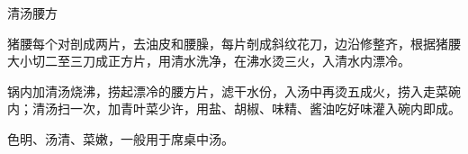 %
%
%
%
%
%
%
\begin{recipe}{清汤腰方}

\ingredients


\preparation

\step 猪腰每个对剖成两片，去油皮和腰臊，每片剞成斜纹花刀，边沿修整齐，根据猪腰
大小切二至三刀成正方片，用清水洗净，在沸水烫三火，入清水内漂冷。

\step 锅内加清汤烧沸，捞起漂冷的腰方片，滤干水份，入汤中再烫五成火，捞入走菜碗
内；清汤扫一次，加青叶菜少许，用盐、胡椒、味精、酱油吃好味灌入碗内即成。

\features

色明、汤清、菜嫩，一般用于席桌中汤。

\end{recipe}

